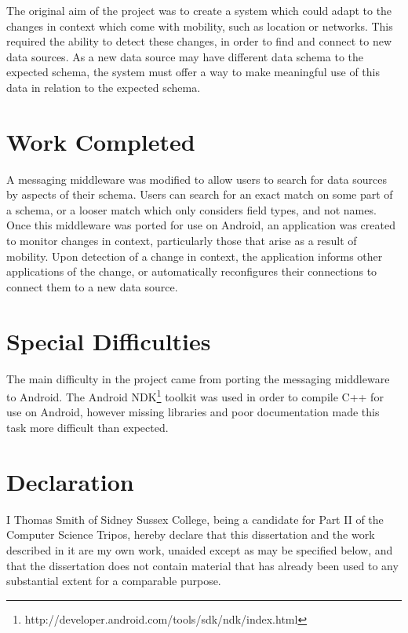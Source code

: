 \documentclass[12pt,twoside,notitlepage]{report}
\begin{document}
The original aim of the project was to create a system which could adapt to the changes in context which come with mobility, such as location or networks. 
This required the ability to detect these changes, in order to find and connect to new data sources. 
As a new data source may have different data schema to the expected schema, the system must offer a way to make meaningful use of this data in relation to the expected schema.

\section*{Work Completed}

A messaging middleware was modified to allow users to search for data sources by aspects of their schema. Users can search for an exact match on some part of a schema, or a looser match which only considers field types, and not names.
Once this middleware was ported for use on Android, an application was created to monitor changes in context, particularly those that arise as a result of mobility. Upon detection of a change in context, the application informs other applications of the change, or automatically reconfigures their connections to connect them to a new data source.

\section*{Special Difficulties}

The main difficulty in the project came from porting the messaging middleware to Android. The Android NDK\footnote{http://developer.android.com/tools/sdk/ndk/index.html} toolkit was used in order to compile C++ for use on Android, however missing libraries and poor documentation made this task more difficult than expected.
 
\newpage
\section*{Declaration}

I Thomas Smith of Sidney Sussex College, being a candidate for Part II of the Computer
Science Tripos, hereby declare that this dissertation and the work described in it are my own work,
unaided except as may be specified below, and that the dissertation
does not contain material that has already been used to any substantial
extent for a comparable purpose.

\bigskip
{}
\end{document}
